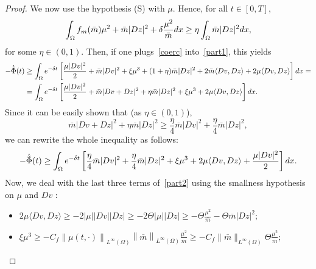 \documentclass[10pt,a4paper]{amsart}
\newcommand{\Sp}{{\textsc (S)} }
\newcommand{\di}{{\rm d}}
\begin{document}
\begin{proof}
	We now use the hypothesis \Sp with $\mu$. 
		Hence, for all $t \in [0,T]$,
		\begin{equation}
			\int_{\Omega} f_m (\bar{m})\mu^2 + \bar{m}|Dz|^2 + \delta \frac{\mu^2}{\bar{m}} \di x \geq \eta \int_{\Omega} \bar{m} |Dz|^2 \di x,
			\label{coerc}
		\end{equation}
		for some $\eta \in (0,1)$.
		Then, if one plugs~\eqref{coerc} into~\eqref{part1}, this yields
		\begin{equation*}
			\begin{split}
				-\dot{\tilde{\Phi}}(t) &\geq \int_{\Omega} e^{-\delta t} \left[ \frac{\mu |Dv|^2}{2} + \bar{m}|Dv|^2 + \xi \mu^3+ (1+\eta)\bar{m}|Dz|^2  + 2\bar{m} \langle Dv,Dz \rangle + 2\mu \langle Dv,Dz \rangle \right] \di x = \\
				&=\int_{\Omega} e^{-\delta t} \left[ \frac{\mu|Dv|^2}{2}+ \bar{m}|Dv+Dz|^2 + \eta \bar{m}|Dz|^2 +\xi  \mu^3 + 2\mu \langle Dv,Dz \rangle \right] \di x.
			\end{split}
		\end{equation*}
		Since it can be easily shown that (as $\eta \in (0,1)$),
		\begin{equation*}
			\bar{m}|Dv+Dz|^2 + \eta \bar{m} |Dz|^2 \geq \frac{\eta}{4} \bar{m} |Dv|^2 + \frac{\eta}{4} \bar{m} |Dz|^2,
		\end{equation*}
		we can rewrite the whole inequality as follows:
		\begin{equation}
			-\dot{\tilde{\Phi}}(t) \geq \int_{\Omega} e^{-\delta t} \left[ \frac{\eta}{4} \bar{m}|Dv|^2 + \frac{\eta}{4} \bar{m}|Dz|^2 +\xi \mu^3 + 2\mu \langle Dv,Dz \rangle + \frac{\mu|Dv|^2}{2} \right] \di x.
			\label{part2}
		\end{equation}
		Now, we deal with the last three terms of~\eqref{part2} using the smallness hypothesis on $\mu$ and $Dv$ :
		\begin{itemize}
			\item $2 \mu \langle Dv,Dz \rangle \geq - 2 |\mu| |Dv| |Dz| \geq - 2 \Theta |\mu| |Dz| \geq - \Theta \frac{\mu^2}{\bar{m}} - \Theta \bar{m}|Dz|^2;$
			\item $\xi \mu^3 \geq - C_f \left \| \mu(t,\cdot) \right \|_{L^{\infty}(\Omega)} \left \| \bar{m} \right \|_{L^{\infty}(\Omega)} \frac{\mu^2}{\bar{m}} \geq - 
			C_f \|\bar{m}\|_{L^{\infty}(\Omega)} \Theta \frac{\mu^2}{\bar{m}};$

\end{itemize}
\end{proof}
\end{document}
